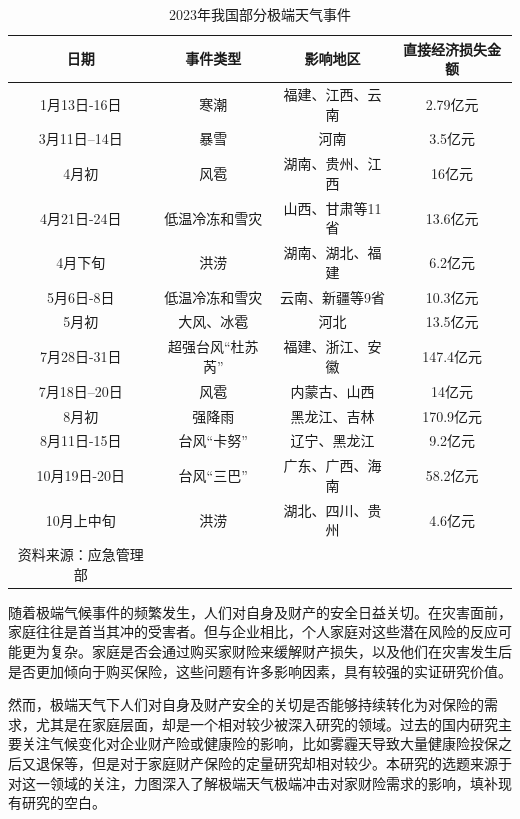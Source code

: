 \begin{longtable}{cccc}
    \caption{2023年我国部分极端天气事件}\\
        \toprule
        \textbf{日期} & \textbf{事件类型} & \textbf{影响地区}&\textbf{直接经济损失金额} \\
        \midrule
        1月13日-16日   & 寒潮        & 福建、江西、云南          &2.79亿元  \\
        3月11日–14日   & 暴雪        & 河南          &3.5亿元  \\
        4月初   & 风雹        & 湖南、贵州、江西          &16亿元  \\
        4月21日-24日   & 低温冷冻和雪灾        & 山西、甘肃等11省          &13.6亿元  \\
        4月下旬   & 洪涝        & 湖南、湖北、福建          &6.2亿元  \\
        5月6日-8日   & 低温冷冻和雪灾        & 云南、新疆等9省          &10.3亿元  \\
        5月初   & 大风、冰雹        & 河北          &13.5亿元  \\
    7月28日-31日   & 超强台风“杜苏芮”        & 福建、浙江、安徽          &147.4亿元  \\
    7月18日–20日   & 风雹        & 内蒙古、山西          &14亿元  \\
        8月初   & 强降雨        & 黑龙江、吉林          &170.9亿元  \\
        8月11日-15日   &台风“卡努”        & 辽宁、黑龙江          &9.2亿元  \\
        10月19日-20日   & 台风“三巴”        & 广东、广西、海南          &58.2亿元  \\
        10月上中旬   & 洪涝        & 湖北、四川、贵州          &4.6亿元  \\
        \bottomrule
    资料来源：应急管理部
\end{longtable}

随着极端气候事件的频繁发生，人们对自身及财产的安全日益关切。在灾害面前，家庭往往是首当其冲的受害者。但与企业相比，个人家庭对这些潜在风险的反应可能更为复杂。家庭是否会通过购买家财险来缓解财产损失，以及他们在灾害发生后是否更加倾向于购买保险，这些问题有许多影响因素，具有较强的实证研究价值。

然而，极端天气下人们对自身及财产安全的关切是否能够持续转化为对保险的需求，尤其是在家庭层面，却是一个相对较少被深入研究的领域。过去的国内研究主要关注气候变化对企业财产险\citep{杨娜娜2019自然灾害与企业现金持有}或健康险\citep{赵强2021空气污染对商业健康保险需求的影响}的影响，比如雾霾天导致大量健康险投保之后又退保等，但是对于家庭财产保险的定量研究却相对较少。本研究的选题来源于对这一领域的关注，力图深入了解极端天气极端冲击对家财险需求的影响，填补现有研究的空白。

